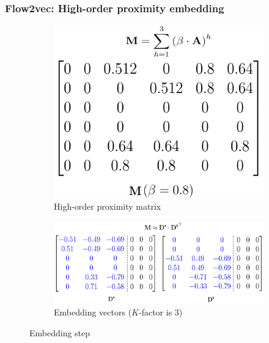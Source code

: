 \documentclass[xcolor=table,english]{beamer}
\begin{document}
\begin{frame}[fragile] \frametitle{Flow2vec: High-order proximity embedding}
    \begin{figure}
        \centering
        \begin{subfigure}[b]{0.38\textwidth}
            \includegraphics[width=\textwidth]{figures/proximity_matrix.png}
            \caption{High-order proximity matrix}
        \end{subfigure}
        \hfill
        \begin{subfigure}[b]{0.6\textwidth}
            \includegraphics[width=\textwidth]{figures/embedding_vectors.png}
            \caption{Embedding vectors ($K$-factor is 3)}
        \end{subfigure}
        \caption{Embedding step}
    \end{figure}
\end{frame}
\end{document}
